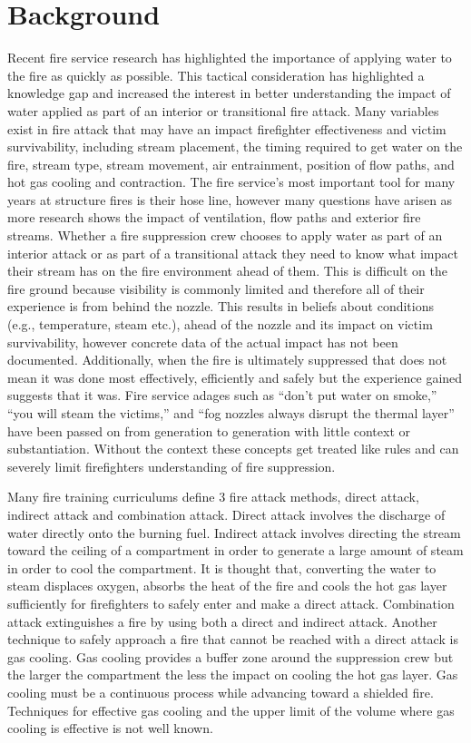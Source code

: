 \documentclass[12pt,oneside]{book}
\begin{document}
\clearpage

\chapter{Background}

Recent fire service research has highlighted the importance of applying water to the fire as quickly as possible. This tactical consideration has highlighted a knowledge gap and increased the interest in better understanding the impact of water applied as part of an interior or transitional fire attack. Many variables exist in fire attack that may have an impact firefighter effectiveness and victim survivability, including stream placement, the timing required to get water on the fire, stream type, stream movement, air entrainment, position of flow paths, and hot gas cooling and contraction. The fire service's most important tool for many years at structure fires is their hose line, however many questions have arisen as more research shows the impact of ventilation, flow paths and exterior fire streams. Whether a fire suppression crew chooses to apply water as part of an interior attack or as part of a transitional attack they need to know what impact their stream has on the fire environment ahead of them. This is difficult on the fire ground because visibility is commonly limited and therefore all of their experience is from behind the nozzle. This results in beliefs about conditions (e.g., temperature, steam etc.), ahead of the nozzle and its impact on victim survivability, however concrete data of the actual impact has not been documented. Additionally, when the fire is ultimately suppressed that does not mean it was done most effectively, efficiently and safely but the experience gained suggests that it was. Fire service adages such as ``don't put water on smoke,'' ``you will steam the victims,'' and ``fog nozzles always disrupt the thermal layer'' have been passed on from generation to generation with little context or substantiation. Without the context these concepts get treated like rules and can severely limit firefighters understanding of fire suppression.

Many fire training curriculums define 3 fire attack methods, direct attack, indirect attack and combination attack. Direct attack involves the discharge of water directly onto the burning fuel. Indirect attack involves directing the stream toward the ceiling of a compartment in order to generate a large amount of steam in order to cool the compartment. It is thought that, converting the water to steam displaces oxygen, absorbs the heat of the fire and cools the hot gas layer sufficiently for firefighters to safely enter and make a direct attack. Combination attack extinguishes a fire by using both a direct and indirect attack. Another technique to safely approach a fire that cannot be reached with a direct attack is gas cooling. Gas cooling provides a buffer zone around the suppression crew but the larger the compartment the less the impact on cooling the hot gas layer. Gas cooling must be a continuous process while advancing toward a shielded fire. Techniques for effective gas cooling and the upper limit of the volume where gas cooling is effective is not well known.  
\end{document}
